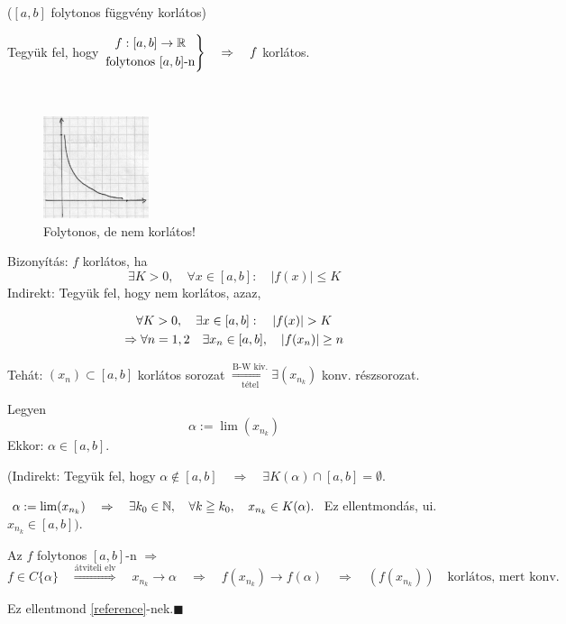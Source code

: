 \documentclass[a4paper,11.5pt]{article}
\begin{document}
		\begin{theorem}
			($[a,b]$ folytonos függvény korlátos)
		
			Tegyük fel, hogy 
			$\left.
			\begin{gathered}
				f:[a,b]\to\mathbb{R} \\
				\text{folytonos } [a,b]\text{-n}
			\end{gathered}
			\right\}\quad  \Rightarrow \quad f $ korlátos.
			\begin{note}\ 
				
				\begin{figure}[!h]
					\centering
					\includegraphics[height=3cm]{kepek/3_abra.jpg}
					\caption{Folytonos, de nem korlátos!}\label{fig_3}
				\end{figure}
			\end{note}
			
			
			Bizonyítás: $f$ korlátos, ha
			\[ \exists K>0, \quad \forall x \in [a,b]: \quad |f(x)|\leq K \]
			Indirekt: Tegyük fel, hogy nem korlátos, azaz, 
			
			\begin{gather}
				\forall K>0, \quad \exists x \in [a,b]: \quad |f(x)|> K \notag\\
				\Rightarrow \forall n = 1,2 \quad \exists x_n \in [a,b], \quad |f(x_n)|\geq n\label{reference} 
			\end{gather} 
			
			Tehát: $(x_n)\subset[a,b]$ korlátos sorozat $\overset{\text{B-W kiv.}}{\underset{\text{tétel}}{\Longrightarrow}} \exists (x_{n_k})$ konv. részsorozat. 
			
			Legyen
			\[ \alpha:=\lim(x_{n_k}) \]
			Ekkor: $\alpha\in[a,b]$.\quad
			
			(Indirekt: Tegyük fel, hogy $\alpha \notin [a,b] \quad \Rightarrow \quad \exists K (\alpha) \cap[a,b] = \emptyset$.
			
			$\alpha:=\lim(x_{n_k})\quad  \Rightarrow \quad \exists k_0\in\mathbb{N},\quad \forall k\geqq k_0, \quad x_{n_k}\in K(\alpha).$ 
			Ez ellentmondás, ui. $x_{n_k}\in[a,b])$.
			\medskip
			
			Az $f$ folytonos $[a,b]$-n $\Rightarrow $
			\[ f\in C \{\alpha\}\quad \overset{\text{átviteli elv}}{\Rightarrow} \quad x_{n_k} \to \alpha \quad \Rightarrow\quad  f(x_{n_k}) \to f(\alpha)\quad  \Rightarrow \quad \left(f(x_{n_k})\right) \quad \text{korlátos, mert konv.}\]
			
			Ez ellentmond \ref{reference}-nek.\quad $\blacksquare$
			
		\end{theorem}
		
\end{document}
